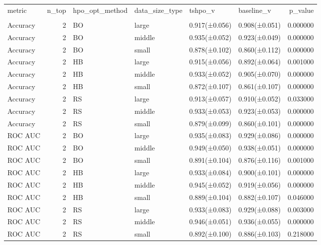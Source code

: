 \begin{tabular}{lrllllr}
\toprule
metric & n_top & hpo_opt_method & data_size_type & tshpo_v & baseline_v & p_value \\
 &  &  &  &  &  &  \\
\midrule
Accuracy & 2 & BO & large & 0.917(±0.056) & 0.908(±0.051) & 0.000000 \\
Accuracy & 2 & BO & middle & 0.935(±0.052) & 0.923(±0.049) & 0.000000 \\
Accuracy & 2 & BO & small & 0.878(±0.102) & 0.860(±0.112) & 0.000000 \\
Accuracy & 2 & HB & large & 0.915(±0.056) & 0.892(±0.064) & 0.001000 \\
Accuracy & 2 & HB & middle & 0.933(±0.052) & 0.905(±0.070) & 0.000000 \\
Accuracy & 2 & HB & small & 0.872(±0.107) & 0.861(±0.107) & 0.000000 \\
Accuracy & 2 & RS & large & 0.913(±0.057) & 0.910(±0.052) & 0.033000 \\
Accuracy & 2 & RS & middle & 0.933(±0.053) & 0.923(±0.053) & 0.000000 \\
Accuracy & 2 & RS & small & 0.879(±0.099) & 0.860(±0.101) & 0.000000 \\
ROC AUC & 2 & BO & large & 0.935(±0.083) & 0.929(±0.086) & 0.000000 \\
ROC AUC & 2 & BO & middle & 0.949(±0.050) & 0.938(±0.051) & 0.000000 \\
ROC AUC & 2 & BO & small & 0.891(±0.104) & 0.876(±0.116) & 0.001000 \\
ROC AUC & 2 & HB & large & 0.933(±0.084) & 0.900(±0.101) & 0.000000 \\
ROC AUC & 2 & HB & middle & 0.945(±0.052) & 0.919(±0.056) & 0.000000 \\
ROC AUC & 2 & HB & small & 0.889(±0.104) & 0.882(±0.107) & 0.046000 \\
ROC AUC & 2 & RS & large & 0.933(±0.083) & 0.929(±0.088) & 0.003000 \\
ROC AUC & 2 & RS & middle & 0.946(±0.051) & 0.936(±0.055) & 0.000000 \\
ROC AUC & 2 & RS & small & 0.892(±0.100) & 0.886(±0.103) & 0.218000 \\
\bottomrule
\end{tabular}
